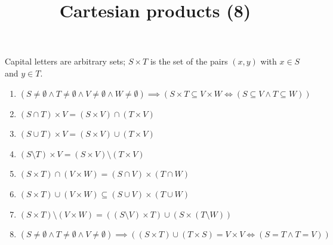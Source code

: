 \documentclass[11pt,a4paper]{article}
\title{Cartesian products (8)}
\author{}
\date{}
\begin{document}
\maketitle
Capital letters are arbitrary sets; $S \times T$ is the set of the pairs $(x, y)$ with $x \in S$ and $y \in T$.

\begin{enumerate}
\item $\displaystyle (S \neq \emptyset \land T \neq \emptyset \land V \neq \emptyset \land W \neq \emptyset) \implies (S \times T \subseteq V \times W \iff (S \subseteq V \land T \subseteq W))$
\item $\displaystyle (S \cap T) \times V = (S \times V) \cap (T \times V)$
\item $\displaystyle (S \cup T) \times V = (S \times V) \cup (T \times V)$
\item $\displaystyle (S \setminus T) \times V = (S \times V) \setminus (T \times V)$
\item $\displaystyle (S \times T) \cap (V \times W) = (S \cap V) \times (T \cap W)$
\item $\displaystyle (S \times T) \cup (V \times W) \subseteq (S \cup V) \times (T \cup W)$
\item $\displaystyle (S \times T) \setminus (V \times W) = ((S \setminus V) \times T) \cup (S \times (T \setminus W))$
\item $\displaystyle (S \neq \emptyset \land T \neq \emptyset \land V \neq \emptyset) \implies ((S \times T) \cup (T \times S) = V \times V \iff (S = T \land T = V))$
\end{enumerate}
\end{document}
